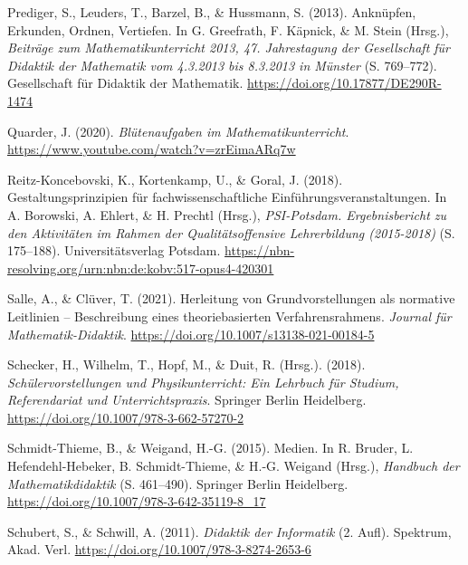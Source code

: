 \documentclass[
]{scrbook}
\newlength{\cslhangindent}
\newlength{\cslentryspacingunit} %
\newenvironment{CSLReferences}[2] %
 {%
  \setlength{\parindent}{0pt}
  \ifodd #1
  \let\oldpar\par
  \def\par{\hangindent=\cslhangindent\oldpar}
  \fi
  \setlength{\parskip}{#2\cslentryspacingunit}
 }%
 {}
\theoremstyle{definition}
\theoremstyle{definition}
\theoremstyle{definition}
\theoremstyle{definition}
\theoremstyle{remark}
\begin{document}
\begin{CSLReferences}{1}{0}
\leavevmode{}%
Prediger, S., Leuders, T., Barzel, B., \& Hussmann, S. (2013). Anknüpfen, {Erkunden}, {Ordnen}, {Vertiefen}. In G. Greefrath, F. Käpnick, \& M. Stein (Hrsg.), \emph{Beiträge zum {Mathematikunterricht} 2013, 47. {Jahrestagung} der {Gesellschaft} für {Didaktik} der {Mathematik} vom 4.3.2013 bis 8.3.2013 in {Münster}} (S. 769--772). Gesellschaft für Didaktik der Mathematik. \url{https://doi.org/10.17877/DE290R-1474}

\leavevmode{}%
Quarder, J. (2020). \emph{Blütenaufgaben im {Mathematikunterricht}}. \url{https://www.youtube.com/watch?v=zrEimaARq7w}

\leavevmode{}%
Reitz-Koncebovski, K., Kortenkamp, U., \& Goral, J. (2018). Gestaltungsprinzipien für fachwissenschaftliche {Einführungsveranstaltungen}. In A. Borowski, A. Ehlert, \& H. Prechtl (Hrsg.), \emph{{PSI}-{Potsdam}. {Ergebnisbericht} zu den {Aktivitäten} im {Rahmen} der {Qualitätsoffensive} {Lehrerbildung} (2015-2018)} (S. 175--188). Universitätsverlag Potsdam. \url{https://nbn-resolving.org/urn:nbn:de:kobv:517-opus4-420301}

\leavevmode{}%
Salle, A., \& Clüver, T. (2021). Herleitung von {Grundvorstellungen} als normative {Leitlinien} -- {Beschreibung} eines theoriebasierten {Verfahrensrahmens}. \emph{Journal für Mathematik-Didaktik}. \url{https://doi.org/10.1007/s13138-021-00184-5}

\leavevmode{}%
Schecker, H., Wilhelm, T., Hopf, M., \& Duit, R. (Hrsg.). (2018). \emph{Schülervorstellungen und {Physikunterricht}: {Ein} {Lehrbuch} für {Studium}, {Referendariat} und {Unterrichtspraxis}}. Springer Berlin Heidelberg. \url{https://doi.org/10.1007/978-3-662-57270-2}

\leavevmode{}%
Schmidt-Thieme, B., \& Weigand, H.-G. (2015). Medien. In R. Bruder, L. Hefendehl-Hebeker, B. Schmidt-Thieme, \& H.-G. Weigand (Hrsg.), \emph{Handbuch der {Mathematikdidaktik}} (S. 461--490). Springer Berlin Heidelberg. \url{https://doi.org/10.1007/978-3-642-35119-8_17}

\leavevmode{}%
Schubert, S., \& Schwill, A. (2011). \emph{Didaktik der {Informatik}} (2. Aufl). Spektrum, Akad. Verl. \url{https://doi.org/10.1007/978-3-8274-2653-6}


\end{CSLReferences}
\end{document}
